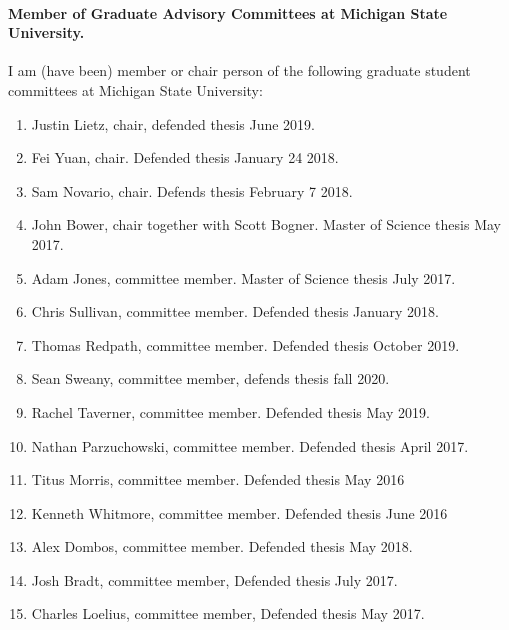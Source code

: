 \documentclass[%
oneside,                 %
final,                   %
10pt]{article}
\begin{document}
\paragraph{Member of Graduate Advisory Committees at Michigan State University.}
I am (have been) member or chair person of the following graduate  student committees at Michigan State University:
\begin{enumerate}
\item Justin Lietz, chair, defended thesis June 2019.

\item Fei Yuan, chair.  Defended thesis January 24 2018.

\item Sam Novario, chair. Defends thesis February 7 2018.

\item John Bower, chair together with Scott Bogner. Master of Science thesis May 2017.  

\item Adam Jones, committee member. Master of Science thesis July 2017.  

\item Chris Sullivan, committee member. Defended thesis January 2018.

\item Thomas Redpath, committee member. Defended thesis October 2019.

\item Sean Sweany, committee member, defends thesis fall 2020.

\item Rachel Taverner, committee member. Defended thesis May 2019.

\item Nathan Parzuchowski, committee member. Defended thesis April 2017.

\item Titus Morris, committee member. Defended thesis May 2016

\item Kenneth Whitmore, committee member. Defended thesis June 2016

\item Alex Dombos, committee member. Defended thesis May 2018.

\item Josh Bradt, committee member, Defended thesis July 2017.

\item Charles Loelius, committee member, Defended thesis May 2017.


\end{enumerate}
\end{document}
